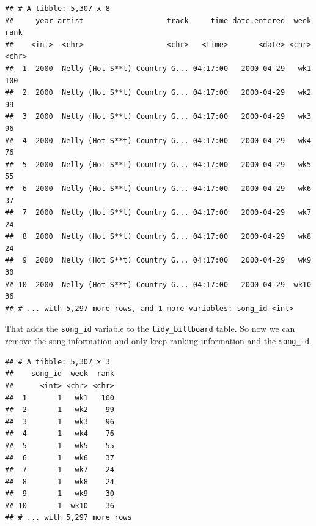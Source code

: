 \documentclass[12pt,]{book}
\newenvironment{Shaded}{\begin{snugshade}}{\end{snugshade}}
\newcommand{\KeywordTok}[1]{\textcolor[rgb]{0.13,0.29,0.53}{\textbf{#1}}}
\newcommand{\StringTok}[1]{\textcolor[rgb]{0.31,0.60,0.02}{#1}}
\newcommand{\OperatorTok}[1]{\textcolor[rgb]{0.81,0.36,0.00}{\textbf{#1}}}
\newcommand{\NormalTok}[1]{#1}
\theoremstyle{definition}
\theoremstyle{definition}
\theoremstyle{remark}
\begin{document}
\begin{verbatim}
## # A tibble: 5,307 x 8
##     year artist                   track     time date.entered  week  rank
##    <int>  <chr>                   <chr>   <time>       <date> <chr> <chr>
##  1  2000  Nelly (Hot S**t) Country G... 04:17:00   2000-04-29   wk1   100
##  2  2000  Nelly (Hot S**t) Country G... 04:17:00   2000-04-29   wk2    99
##  3  2000  Nelly (Hot S**t) Country G... 04:17:00   2000-04-29   wk3    96
##  4  2000  Nelly (Hot S**t) Country G... 04:17:00   2000-04-29   wk4    76
##  5  2000  Nelly (Hot S**t) Country G... 04:17:00   2000-04-29   wk5    55
##  6  2000  Nelly (Hot S**t) Country G... 04:17:00   2000-04-29   wk6    37
##  7  2000  Nelly (Hot S**t) Country G... 04:17:00   2000-04-29   wk7    24
##  8  2000  Nelly (Hot S**t) Country G... 04:17:00   2000-04-29   wk8    24
##  9  2000  Nelly (Hot S**t) Country G... 04:17:00   2000-04-29   wk9    30
## 10  2000  Nelly (Hot S**t) Country G... 04:17:00   2000-04-29  wk10    36
## # ... with 5,297 more rows, and 1 more variables: song_id <int>
\end{verbatim}

That adds the \texttt{song\_id} variable to the \texttt{tidy\_billboard}
table. So now we can remove the song information and only keep ranking
information and the \texttt{song\_id}.

\begin{Shaded}
\end{Shaded}

\begin{verbatim}
## # A tibble: 5,307 x 3
##    song_id  week  rank
##      <int> <chr> <chr>
##  1       1   wk1   100
##  2       1   wk2    99
##  3       1   wk3    96
##  4       1   wk4    76
##  5       1   wk5    55
##  6       1   wk6    37
##  7       1   wk7    24
##  8       1   wk8    24
##  9       1   wk9    30
## 10       1  wk10    36
## # ... with 5,297 more rows
\end{verbatim}
\end{document}
